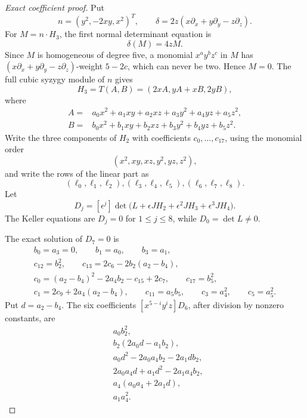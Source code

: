 \begin{proof}[Exact coefficient proof]
Put
\[
 n=(y^2,-2xy,x^2)^T,
 \qquad
 \delta=2z(x\partial_x+y\partial_y-z\partial_z).
\]
For \(M=n\cdot H_3\), the first normal determinant equation is
\[
 \delta(M)=4zM.
\]
Since \(M\) is homogeneous of degree five, a monomial
\(x^ay^bz^c\) in \(M\) has
\((x\partial_x+y\partial_y-z\partial_z)\)-weight \(5-2c\), which can never
be two.  Hence \(M=0\).  The full cubic syzygy module of \(n\) gives
\[
 H_3=T(A,B)=(2xA,yA+xB,2yB),
\]
where
\[
\begin{aligned}
A={}&a_0x^2+a_1xy+a_2xz+a_3y^2+a_4yz+a_5z^2,\\
B={}&b_0x^2+b_1xy+b_2xz+b_3y^2+b_4yz+b_5z^2.
\end{aligned}
\]
Write the three components of \(H_2\) with coefficients
\(c_0,\ldots,c_{17}\), using the monomial order
\[
 (x^2,xy,xz,y^2,yz,z^2),
\]
and write the rows of the linear part as
\[
 (\ell_0,\ell_1,\ell_2),
 (\ell_3,\ell_4,\ell_5),
 (\ell_6,\ell_7,\ell_8).
\]
Let
\[
 D_j=[\epsilon^j]\det\bigl(L+\epsilon JH_2+
             \epsilon^2JH_3+\epsilon^3JH_4\bigr).
\]
The Keller equations are \(D_j=0\) for \(1\le j\le8\), while
\(D_0=\det L\ne0\).

The exact solution of \(D_7=0\) is
\[
\begin{gathered}
 b_0=a_3=0,\qquad b_1=a_0,\qquad b_3=a_1,\\
 c_{12}=b_2^2,\qquad
 c_{13}=2c_6-2b_2(a_2-b_4),\\
 c_0=(a_2-b_4)^2-2a_4b_2-c_{15}+2c_7,\qquad
 c_{17}=b_5^2,\\
 c_1=2c_9+2a_4(a_2-b_4),\qquad
 c_{11}=a_5b_5,\qquad c_3=a_4^2,\qquad c_5=a_5^2.
\end{gathered}
\]
Put \(d=a_2-b_4\).  The six coefficients
\([x^{5-i}y^iz]D_6\), after division by nonzero constants, are
\[
\begin{aligned}
&a_0b_2^2,\\
&b_2(2a_0d-a_1b_2),\\
&a_0d^2-2a_0a_4b_2-2a_1db_2,\\
&2a_0a_4d+a_1d^2-2a_1a_4b_2,\\
&a_4(a_0a_4+2a_1d),\\
&a_1a_4^2.
\end{aligned}                                                    \tag{Z.1}
\]


\end{proof}

